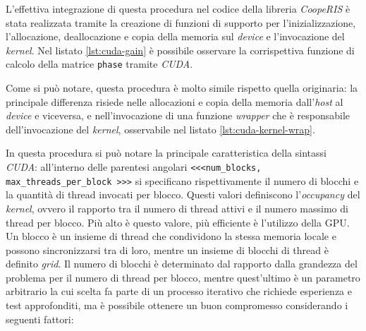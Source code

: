 L'effettiva integrazione di questa procedura nel codice della libreria \textit{CoopeRIS}
è stata realizzata tramite la creazione di funzioni di supporto per l'inizializzazione,
l'allocazione, deallocazione e copia della memoria sul \textit{device} e l'invocazione
del \textit{kernel}. Nel listato \ref{lst:cuda-gain} è possibile osservare la
corrispettiva funzione di calcolo della matrice \texttt{phase} tramite \textit{CUDA}.

\vspace{1em}

\vspace{1em}

Come si può notare, questa procedura è molto simile rispetto quella originaria: la
principale differenza risiede nelle allocazioni e copia della memoria dall'\textit{host}
al \textit{device} e viceversa, e nell'invocazione di una funzione \textit{wrapper}
che è responsabile dell'invocazione del \textit{kernel}, osservabile nel listato
\ref{lst:cuda-kernel-wrap}.

\vspace{1em}

\vspace{1em}

In questa procedura si può notare la principale caratteristica della sintassi
\textit{CUDA}: all'interno delle parentesi angolari \texttt{<<<num\_blocks, max\_threads\_per\_block
>>>} si specificano rispettivamente il numero di blocchi e la quantità di thread
invocati per blocco. Questi valori definiscono l'\textit{occupancy} del \textit{kernel},
ovvero il rapporto tra il numero di thread attivi e il numero massimo di thread per
blocco. Più alto è questo valore, più efficiente è l'utilizzo della GPU. Un
blocco è un insieme di thread che condividono la stessa memoria locale e possono
sincronizzarsi tra di loro, mentre un insieme di blocchi di thread è definito \textit{grid}.
Il numero di blocchi è determinato dal rapporto dalla grandezza del problema per
il numero di thread per blocco, mentre quest'ultimo è un parametro arbitrario la
cui scelta fa parte di un processo iterativo che richiede esperienza e test
approfonditi, ma è possibile ottenere un buon compromesso considerando i seguenti
fattori:


